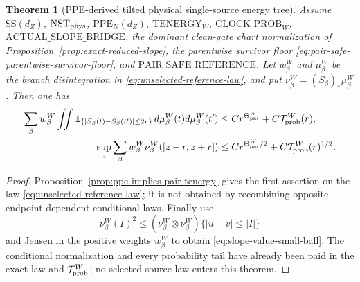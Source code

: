 \documentclass[11pt]{article}
\newtheorem{theorem}{Theorem}[section]
\begin{document}
\begin{theorem}[PPE-derived tilted physical single-source energy tree]
\label{thm:direct-slope-small-ball}
Assume $\mathrm{SS}(d_Z)$, $\mathrm{NST}_{\rm phys}$,
$\mathrm{PPE}_{N}(d_Z)$, $\mathrm{TENERGY}_{W}$,
$\mathrm{CLOCK\_PROB}_{W}$,
$\mathrm{ACTUAL\_SLOPE\_BRIDGE}$, the dominant clean-gate chart
normalization of Proposition~\ref{prop:exact-reduced-slope},
the parentwise survivor floor
\eqref{eq:pair-safe-parentwise-survivor-floor}, and
$\mathrm{PAIR\_SAFE\_REFERENCE}$.  Let $w_\beta^{W}$ and $\mu_\beta^{W}$ be the
branch disintegration in \eqref{eq:unselected-reference-law}, and put
$\nu_\beta^{W}=(S_\beta)_*\mu_\beta^{W}$.  Then
one has
\begin{align}
 \sum_\beta w_\beta^{W}\iint
   \mathbf 1_{\{|S_\beta(t)-S_\beta(t')|\le2r\}}
   \,d\mu_\beta^{W}(t)d\mu_\beta^{W}(t')
 &\le Cr^{\Theta_{\rm par}^{W}}+C\mathcal T_{\rm prob}^{W}(r),\label{eq:conditional-energy-bound}\\
 \sup_z\sum_\beta w_\beta^{W}\nu_\beta^{W}([z-r,z+r])
 &\le Cr^{\Theta_{\rm par}^{W}/2}+C\mathcal T_{\rm prob}^{W}(r)^{1/2}.
 \label{eq:slope-value-small-ball}
\end{align}
\end{theorem}

\begin{proof}
Proposition~\ref{prop:ppe-implies-pair-tenergy} gives the first assertion
on the law \eqref{eq:unselected-reference-law}; it is not obtained by
recombining opposite-endpoint-dependent conditional laws.  Finally use
\[
 \nu_\beta^{W}(I)^2\le
 (\nu_\beta^{W}\otimes\nu_\beta^{W})\{|u-v|\le|I|\}
\]
and Jensen in the positive weights $w_\beta^{W}$ to obtain
\eqref{eq:slope-value-small-ball}.  The conditional normalization and every
probability tail have already been paid in the exact law and
$\mathcal T_{\rm prob}^{W}$; no selected source law enters this theorem.
\end{proof}
\end{document}
